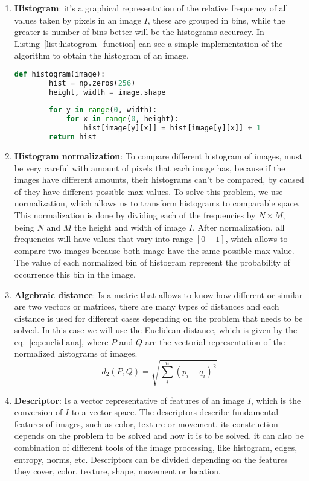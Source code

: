 \documentclass[journal]{IEEEtran}
\begin{document}
\begin{enumerate}
	\item \textbf{Histogram}: it's a graphical representation of the relative frequency of all values taken by pixels in an image $I$, these are grouped in bins, while the greater is number of bins better will be the histograms accuracy. In Listing~\ref{list:histogram_function} can see a simple implementation of the algorithm to obtain the histogram of an image.
	
	\begin{lstlisting}[language=Python, caption=Histogram function, label=list:histogram_function]
	def histogram(image):
		hist = np.zeros(256)
		height, width = image.shape
		
		for y in range(0, width):
			for x in range(0, height):
				hist[image[y][x]] = hist[image[y][x]] + 1
		return hist
	\end{lstlisting}
	
	
	\item \textbf{Histogram normalization}: To compare different histogram of images, must be very careful with amount of pixels that each image has, because if the images have different amounts, their histograms can't be compared, by caused of they have different possible max values. To solve this problem, we use normalization, which allows us to transform histograms to comparable space. This normalization is done by dividing each of the frequencies by $N\times M$, being $N$ and $M$ the height and width of image $I$. After normalization, all frequencies will have values that vary into range $[0-1]$, which allows to compare two images because both image have the same possible max value. The value of each normalized bin of histogram represent the probability of occurrence this bin in the image.
	
	\item \textbf{Algebraic distance}: Is a metric that allows to know how different or similar are two vectors or matrices, there are many types of distances and each distance is used for different cases depending on the problem that needs to be solved. In this case we will use the Euclidean distance, which is given by the eq.~\ref{eq:euclidiana}, where $P$ and $Q$ are the vectorial representation of the normalized histograms of images.
	\begin{equation}
	\label{eq:euclidiana}
	d_2(P, Q) = \sqrt{\sum_{i}^{n} (p_i - q_i)^{2}}
	\end{equation}
	
	\item \textbf{Descriptor}: Is a vector representative of features of an image $I$, which is the conversion of $I$ to a vector space. The descriptors describe fundamental features of images, such as color, texture or movement. its construction depends on the problem to be solved and how it is to be solved. it can also be combination of different tools of the image processing, like histogram, edges, entropy, norms, etc. Descriptors can be divided depending on the features they cover, color, texture, shape, movement or location.
	
\end{enumerate}
\end{document}
